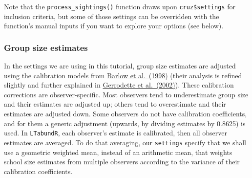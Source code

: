 \documentclass[
]{book}
\newenvironment{Shaded}{\begin{snugshade}}{\end{snugshade}}
\newcommand{\ConstantTok}[1]{\textcolor[rgb]{0.00,0.00,0.00}{#1}}
\newcommand{\DecValTok}[1]{\textcolor[rgb]{0.00,0.00,0.81}{#1}}
\newcommand{\ErrorTok}[1]{\textcolor[rgb]{0.64,0.00,0.00}{\textbf{#1}}}
\newcommand{\NormalTok}[1]{#1}
\newcommand{\SpecialCharTok}[1]{\textcolor[rgb]{0.00,0.00,0.00}{#1}}
\newcommand{\StringTok}[1]{\textcolor[rgb]{0.31,0.60,0.02}{#1}}
\begin{document}
\begin{Shaded}
\end{Shaded}

Note that the \texttt{process\_sightings()} function draws upon \texttt{cruz\$settings} for inclusion criteria, but some of those settings can be overridden with the function's manual inputs if you want to explore your options (see below).

\hypertarget{ss_calibration}{%
\subsubsection*{Group size estimates}\label{ss_calibration}}

In the settings we are using in this tutorial, group size estimates are adjusted using the calibration models from \href{https://repository.library.noaa.gov/view/noaa/25848}{Barlow et al.~(1998)} (their analysis is refined slightly and further explained in \href{https://www.academia.edu/download/45586682/lj_02_08.pdf}{Gerrodette et al.~(2002)}). These calibration corrections are observer-specific. Most observers tend to underestimate group size and their estimates are adjusted up; others tend to overestimate and their estimates are adjusted down. Some observers do not have calibration coefficients, and for them a generic adjustment (upwards, by dividing estimates by 0.8625) is used. In \texttt{LTabundR}, each observer's estimate is calibrated, then all observer estimates are averaged. To do that averaging, our \texttt{settings} specify that we shall use a geometric weighted mean, instead of an arithmetic mean, that weights school size estimates from multiple observers according to the variance of their calibration coefficients.
\end{document}
